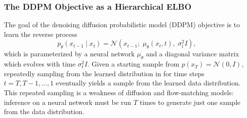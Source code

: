 \subsubsection{The DDPM Objective as a Hierarchical ELBO}

The goal of the denoising diffusion probabilistic model (DDPM) objective is to learn the reverse process
\begin{equation}
    p_\theta(x_{t-1} \mid x_t) = \mathcal{N}\!\left(x_{t-1};\; \mu_\theta(x_t, t),\; \sigma_t^2 I\right),
    \label{eqn:reverse_step}
\end{equation}
which is parameterized by a neural network $\mu_\theta$ and a diagonal variance matrix which evolves with time $\sigma_t^2 I$.
Given a starting sample from $p(x_T) = \mathcal{N}(0, I)$, repeatedly sampling from the learned distribution in  for time steps $t = T, T-1, \ldots, 1$ eventually yields a sample from the learned data distribution.
This repeated sampling is a weakness of diffusion and flow-matching models: inference on a neural network must be run $T$ times to generate just one sample from the data distribution.

